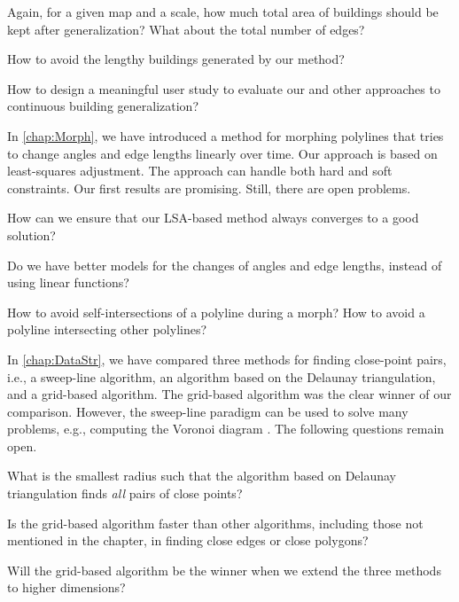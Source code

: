 \begin{open}
  Again, for a given map and a scale, 
  how much total area of buildings should be kept 
  after generalization? 
  What about the total number of edges?
\end{open}

\begin{open}
  How to avoid the lengthy buildings generated by our method?
\end{open}

\begin{open}
  How to design a meaningful user study 
  to evaluate our and other approaches 
  to continuous building generalization?
\end{open}

In \chap\ref{chap:Morph}, 
we have introduced a method for morphing polylines 
that tries to change angles and edge lengths linearly over time. 
Our approach is based on least-squares adjustment.
The approach can handle both hard and soft constraints. 
Our first results are promising. 
Still, there are open problems. 

\begin{open}
  How can we ensure that our LSA-based method always 
  converges to a good solution?
\end{open}

\begin{open}
  Do we have better models for the changes of 
  angles and edge lengths, instead of using linear functions?
\end{open}

\begin{open}
  How to avoid self-intersections of a polyline during a morph?
  How to avoid a polyline intersecting other polylines?
\end{open}

In \chap\ref{chap:DataStr}, we have compared three methods
for finding close-point pairs, i.e., a sweep-line algorithm, 
an algorithm based on the Delaunay triangulation, 
and a grid-based algorithm.
The grid-based algorithm was 
the clear winner of our comparison.
However, the sweep-line paradigm 
can be used to solve many problems,
e.g., computing the Voronoi diagram 
\parencite{Fortune1987Voronoi}.
The following questions remain open.

\begin{open}
  What is the smallest radius such that 
  the algorithm based on Delaunay triangulation
  finds \emph{all} pairs of close points?
\end{open}

\begin{open}
  Is the grid-based algorithm faster than other algorithms, 
  including those not mentioned in the chapter, 
  in finding close edges or close polygons?
\end{open}

\begin{open}
  Will the grid-based algorithm be the winner
  when we extend the three methods to higher dimensions?
\end{open}